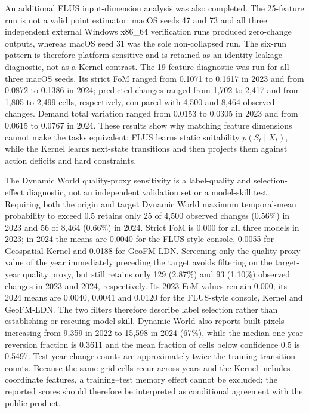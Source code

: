 An additional FLUS input-dimension analysis was also completed. The
25-feature run is not a valid point estimator: macOS seeds 47 and 73 and
all three independent external Windows x86\_64 verification runs
produced zero-change outputs, whereas macOS seed 31 was the sole
non-collapsed run. The six-run pattern is therefore platform-sensitive
and is retained as an identity-leakage diagnostic, not as a Kernel
contrast. The 19-feature diagnostic was run for all three macOS seeds.
Its strict FoM ranged from 0.1071 to 0.1617 in 2023 and from 0.0872 to
0.1386 in 2024; predicted changes ranged from 1,702 to 2,417 and from
1,805 to 2,499 cells, respectively, compared with 4,500 and 8,464
observed changes. Demand total variation ranged from 0.0153 to 0.0305 in
2023 and from 0.0615 to 0.0767 in 2024. These results show why matching
feature dimensions cannot make the tasks equivalent: FLUS learns static
suitability \(p(S_t\mid X_t)\), while the Kernel learns next-state
transitions and then projects them against action deficits and hard
constraints.

The Dynamic World quality-proxy sensitivity is a label-quality and
selection-effect diagnostic, not an independent validation set or a
model-skill test. Requiring both the origin and target Dynamic World
maximum temporal-mean probability to exceed 0.5 retains only 25 of 4,500
observed changes (0.56\%) in 2023 and 56 of 8,464 (0.66\%) in 2024.
Strict FoM is 0.000 for all three models in 2023; in 2024 the means are
0.0040 for the FLUS-style console, 0.0055 for Geospatial Kernel and
0.0188 for GeoFM-LDN. Screening only the quality-proxy value of the year
immediately preceding the target avoids filtering on the target-year
quality proxy, but still retains only 129 (2.87\%) and 93 (1.10\%)
observed changes in 2023 and 2024, respectively. Its 2023 FoM values
remain 0.000; its 2024 means are 0.0040, 0.0041 and 0.0120 for the
FLUS-style console, Kernel and GeoFM-LDN. The two filters therefore
describe label selection rather than establishing or rescuing model
skill. Dynamic World also reports built pixels increasing from 9,359 in
2022 to 15,598 in 2024 (67\%), while the median one-year reversion
fraction is 0.3611 and the mean fraction of cells below confidence 0.5
is 0.5497. Test-year change counts are approximately twice the
training-transition counts. Because the same grid cells recur across
years and the Kernel includes coordinate features, a training--test
memory effect cannot be excluded; the reported scores should therefore
be interpreted as conditional agreement with the public product.

